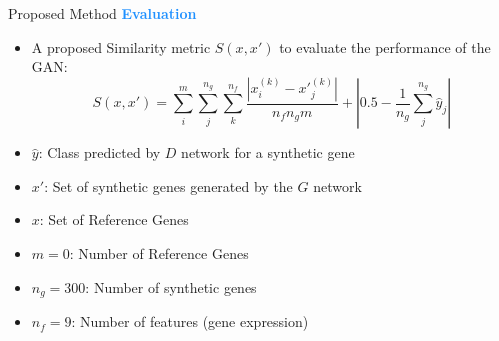 \begin{frame}{Proposed Method}
    \Large\textcolor{dodgerblue}{\textbf{Evaluation}}
    \normalsize
    \vspace{5pt}
    \begin{itemize}
        \item A proposed Similarity metric $S(x, x')$ to evaluate the performance of the GAN:
        \begin{equation*}
            S\left(x,x'\right)=\sum_{i}^{m}\sum_{j}^{n_{g}}\sum_{k}^{n_{f}} \frac{|{x_{i}^{(k)}-{x'}_{j}^{(k)}}|}{n_{f}n_{g}m}  + |0.5 - \frac{1}{n_{g}}\sum_{j}^{n_{g}}\hat{y}_j|
        \end{equation*}
        \item $\hat{y}$: Class predicted by $D$ network for a synthetic gene
        \vspace{1pt}
        \item $x'$: Set of synthetic genes generated by the $G$ network
        \vspace{1pt}
        \item $x$: Set of Reference Genes
        \vspace{1pt}
        \item $m=0$: Number of Reference Genes
        \vspace{1pt}
        \item $n_g=300$: Number of synthetic genes
        \vspace{1pt}
        \item $n_f=9$: Number of features (gene expression)
    \end{itemize}
\end{frame}

